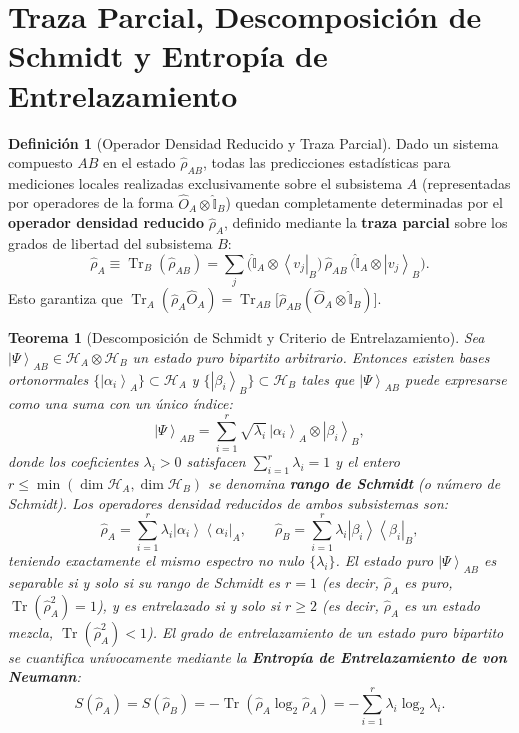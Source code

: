 \documentclass[11pt,a4paper,twoside]{report}
\theoremstyle{definition}
\newtheorem{definicion}{Definición}[chapter]
\theoremstyle{plain}
\newtheorem{teorema}{Teorema}[chapter]
\theoremstyle{remark}
\newcommand{\ket}[1]{\left| #1 \right\rangle}
\newcommand{\bra}[1]{\left\langle #1 \right|}
\newcommand{\ketbra}[2]{\left| #1 \right\rangle\!\left\langle #2 \right|}
\newcommand{\tr}{\operatorname{Tr}}
\newcommand{\Hil}{\mathcal{H}}
\newcommand{\op}[1]{\hat{#1}}
\newcommand{\ident}{\hat{\mathbb{I}}}
\begin{document}
\section{Traza Parcial, Descomposición de Schmidt y Entropía de Entrelazamiento}

\begin{definicion}[Operador Densidad Reducido y Traza Parcial]
Dado un sistema compuesto $AB$ en el estado $\op{\rho}_{AB}$, todas las predicciones estadísticas para mediciones locales realizadas exclusivamente sobre el subsistema $A$ (representadas por operadores de la forma $\op{O}_A \otimes \ident_B$) quedan completamente determinadas por el \textbf{operador densidad reducido} $\op{\rho}_A$, definido mediante la \textbf{traza parcial} sobre los grados de libertad del subsistema $B$:
\begin{equation}
    \op{\rho}_A \equiv \tr_B(\op{\rho}_{AB}) = \sum_{j} \big(\ident_A \otimes \bra{v_j}_B\big) \, \op{\rho}_{AB} \, \big(\ident_A \otimes \ket{v_j}_B\big).
\end{equation}
Esto garantiza que $\tr_A(\op{\rho}_A \op{O}_A) = \tr_{AB}\big[\op{\rho}_{AB}(\op{O}_A \otimes \ident_B)\big]$.
\end{definicion}

\begin{teorema}[Descomposición de Schmidt y Criterio de Entrelazamiento]
Sea $\ket{\Psi}_{AB} \in \Hil_A \otimes \Hil_B$ un estado puro bipartito arbitrario. Entonces existen bases ortonormales $\{\ket{\alpha_i}_A\} \subset \Hil_A$ y $\{\ket{\beta_i}_B\} \subset \Hil_B$ tales que $\ket{\Psi}_{AB}$ puede expresarse como una suma con un único índice:
\begin{equation}
    \ket{\Psi}_{AB} = \sum_{i=1}^{r} \sqrt{\lambda_i}\, \ket{\alpha_i}_A \otimes \ket{\beta_i}_B,
\end{equation}
donde los coeficientes $\lambda_i > 0$ satisfacen $\sum_{i=1}^r \lambda_i = 1$ y el entero $r \le \min(\dim\Hil_A, \dim\Hil_B)$ se denomina \textbf{rango de Schmidt} (o número de Schmidt). Los operadores densidad reducidos de ambos subsistemas son:
\begin{equation}
    \op{\rho}_A = \sum_{i=1}^r \lambda_i \ketbra{\alpha_i}{\alpha_i}_A, \qquad \op{\rho}_B = \sum_{i=1}^r \lambda_i \ketbra{\beta_i}{\beta_i}_B,
\end{equation}
teniendo exactamente el mismo espectro no nulo $\{\lambda_i\}$. El estado puro $\ket{\Psi}_{AB}$ es separable si y solo si su rango de Schmidt es $r = 1$ (es decir, $\op{\rho}_A$ es puro, $\tr(\op{\rho}_A^2) = 1$), y es entrelazado si y solo si $r \ge 2$ (es decir, $\op{\rho}_A$ es un estado mezcla, $\tr(\op{\rho}_A^2) < 1$). El grado de entrelazamiento de un estado puro bipartito se cuantifica unívocamente mediante la \textbf{Entropía de Entrelazamiento de von Neumann}:
\begin{equation}
    S(\op{\rho}_A) = S(\op{\rho}_B) = -\tr(\op{\rho}_A \log_2 \op{\rho}_A) = -\sum_{i=1}^r \lambda_i \log_2 \lambda_i.
\end{equation}
\end{teorema}
\end{document}
